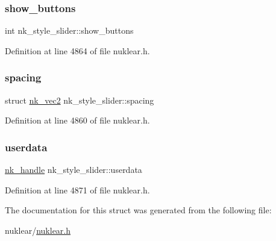 \subsubsection{\texorpdfstring{show\+\_\+buttons}{show\_buttons}}
{\footnotesize\ttfamily int nk\+\_\+style\+\_\+slider\+::show\+\_\+buttons}



Definition at line 4864 of file nuklear.\+h.

\mbox{\label{structnk__style__slider_a24853b62553da926bd2476e5305f27d4}} 
\subsubsection{\texorpdfstring{spacing}{spacing}}
{\footnotesize\ttfamily struct \mbox{\hyperlink{structnk__vec2}{nk\+\_\+vec2}} nk\+\_\+style\+\_\+slider\+::spacing}



Definition at line 4860 of file nuklear.\+h.

\mbox{\label{structnk__style__slider_a6376ac01b14a9da29af611b9d2aeecd2}} 
\subsubsection{\texorpdfstring{userdata}{userdata}}
{\footnotesize\ttfamily \mbox{\hyperlink{unionnk__handle}{nk\+\_\+handle}} nk\+\_\+style\+\_\+slider\+::userdata}



Definition at line 4871 of file nuklear.\+h.



The documentation for this struct was generated from the following file\+:\begin{DoxyCompactItemize}
\item 
nuklear/\mbox{\hyperlink{nuklear_8h}{nuklear.\+h}}\end{DoxyCompactItemize}
